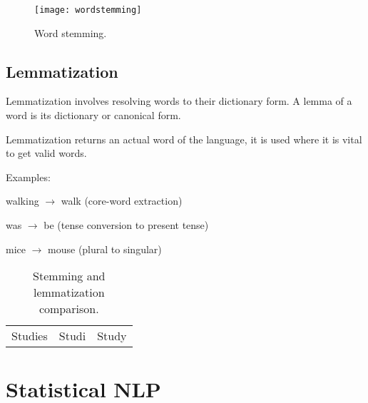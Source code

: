 	\begin{figure}[htb]
		\centering
		\texttt{[image: wordstemming]}
		\caption[Word stemming]{Word stemming.}
		\label{fig:wordstemming}
	\end{figure}


	\subsection{Lemmatization}
	\begin{bulletedlist}
		\item Lemmatization involves resolving words to their dictionary form.  A lemma of a word is its dictionary or canonical form.
		\item Lemmatization returns an actual word of the language, it is used where it is vital to get valid words.
		\item Examples:
		\begin{bulletedlist}
			\item walking $\rightarrow$ walk (core-word extraction)
			\item was $\rightarrow$ be (tense conversion to present tense)
			\item mice $\rightarrow$ mouse (plural to singular)
		\end{bulletedlist}
	\end{bulletedlist}

    \begin{table}[htb]
        \centering
        \caption[stemming and lemmatization comparison]{Stemming and lemmatization comparison.}
        \label{tab:stemmingandlemma}
        \begin{tabular}{|c|c|c|} \hline
			\tablecolumnheadervlinesone{Word} 	& \tablecolumnheadervlinestwo{Stem}   & \tablecolumnheadervlinestwo{Lemma}\\ \hline
			Studies						        & Studi                               & Study \\ \hline
		\end{tabular}
	\end{table}



	\section{Statistical NLP}

